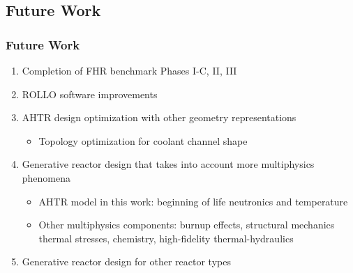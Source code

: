 \subsection{Future Work}
\begin{frame}
    \frametitle{Future Work}
    \begin{enumerate}
        \item Completion of FHR benchmark Phases I-C, II, III
        \item ROLLO software improvements 
        \item AHTR design optimization with other geometry representations 
            \begin{itemize}
                \item Topology optimization for coolant channel shape 
            \end{itemize}
        \item Generative reactor design that takes into account more multiphysics phenomena 
            \begin{itemize}
                \item AHTR model in this work: beginning of life neutronics and temperature 
                \item Other multiphysics components: burnup effects, structural mechanics 
                thermal stresses, chemistry, high-fidelity thermal-hydraulics 
            \end{itemize}
        \item Generative reactor design for other reactor types
    \end{enumerate}
\end{frame}